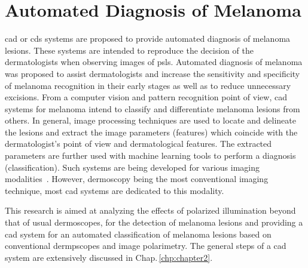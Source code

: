 \section{Automated Diagnosis of Melanoma}
\Ac{cad} or \ac{cds} systems are proposed to provide automated diagnosis of melanoma lesions. 
These systems are intended to reproduce the decision of the dermatologists when observing images of \ac{psls}. 
Automated diagnosis of melanoma was proposed to assist dermatologists and increase the sensitivity and specificity of melanoma recognition in their early stages as well as to reduce unnecessary excisions.
From a computer vision and pattern recognition point of view, \ac{cad} systems for melanoma intend to classify and differentiate melanoma lesions from others.
In general, image processing techniques are used to locate and delineate the lesions and extract the image parameters (features) which coincide with the dermatologist's point of view and dermatological features. 
The extracted parameters are further used with machine learning tools to perform a diagnosis (classification). 
Such systems are being developed for various imaging modalities~\cite{Marchesini2002,Vestergaard2008,korotkov2012computerized}. 
However, dermoscopy being the most conventional imaging technique, most \ac{cad} systems are dedicated to this modality. 

This research is aimed at analyzing the effects of polarized illumination beyond that of usual dermoscopes, for the detection of melanoma lesions and providing a \ac{cad} system for an automated classification of melanoma lesions based on conventional dermpscopes and image polarimetry.
The general steps of a \ac{cad} system are extensively discussed in Chap.\,\ref{chp:chapter2}.

